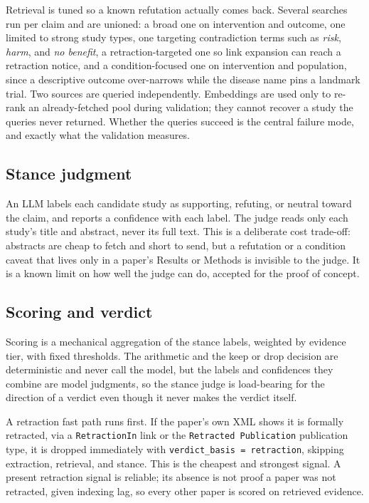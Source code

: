 \documentclass[11pt,a4paper]{article}
\begin{document}
Retrieval is tuned so a known refutation actually comes back. Several searches run per claim and are unioned: a broad one on intervention and outcome, one limited to strong study types, one targeting contradiction terms such as \emph{risk}, \emph{harm}, and \emph{no benefit}, a retraction-targeted one so link expansion can reach a retraction notice, and a condition-focused one on intervention and population, since a descriptive outcome over-narrows while the disease name pins a landmark trial. Two sources are queried independently. Embeddings are used only to re-rank an already-fetched pool during validation; they cannot recover a study the queries never returned. Whether the queries succeed is the central failure mode, and exactly what the validation measures.

\subsection{Stance judgment}

An LLM labels each candidate study as supporting, refuting, or neutral toward the claim, and reports a confidence with each label. The judge reads only each study's title and abstract, never its full text. This is a deliberate cost trade-off: abstracts are cheap to fetch and short to send, but a refutation or a condition caveat that lives only in a paper's Results or Methods is invisible to the judge. It is a known limit on how well the judge can do, accepted for the proof of concept.

\subsection{Scoring and verdict}

Scoring is a mechanical aggregation of the stance labels, weighted by evidence tier, with fixed thresholds. The arithmetic and the keep or drop decision are deterministic and never call the model, but the labels and confidences they combine are model judgments, so the stance judge is load-bearing for the direction of a verdict even though it never makes the verdict itself.

A retraction fast path runs first. If the paper's own XML shows it is formally retracted, via a \texttt{RetractionIn} link or the \texttt{Retracted Publication} publication type, it is dropped immediately with \texttt{verdict\_basis = retraction}, skipping extraction, retrieval, and stance. This is the cheapest and strongest signal. A present retraction signal is reliable; its absence is not proof a paper was not retracted, given indexing lag, so every other paper is scored on retrieved evidence.
\end{document}
